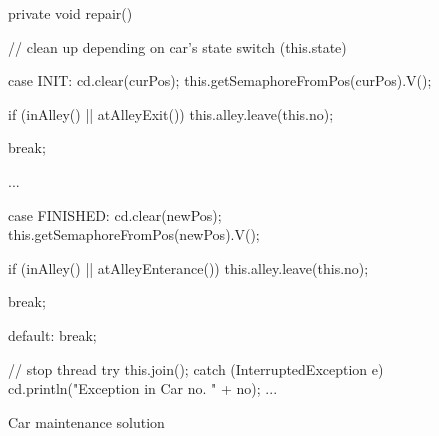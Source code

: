\begin{figure}[H]
  \begin{java}
private void repair() {
    // clean up depending on car's state
    switch (this.state) {
        case INIT:
            cd.clear(curPos);
            this.getSemaphoreFromPos(curPos).V();

            if (inAlley() || atAlleyExit())
                this.alley.leave(this.no);

            break;

        ...

        case FINISHED:
            cd.clear(newPos);
            this.getSemaphoreFromPos(newPos).V();

            if (inAlley() || atAlleyEnterance())
                this.alley.leave(this.no);

            break;

        default:
            break;
    }

    // stop thread
    try {
        this.join();
    } catch (InterruptedException e) {
        cd.println("Exception in Car no. " + no);
        ...
    }
}
  \end{java}
  \caption{Car maintenance solution}
\label{lst:main-rep}
\end{figure}

